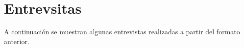 \chapter{Entrevsitas}
\label{cap:Entrevsitas}


A continuación se muestran algunas entrevistas realizadas a partir del formato anterior.



